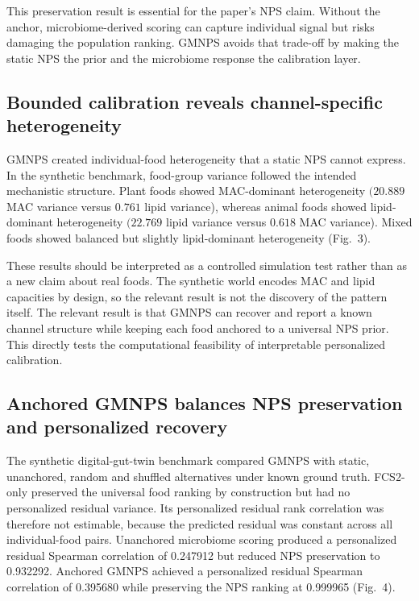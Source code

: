 This preservation result is essential for the paper's NPS claim. Without the
anchor, microbiome-derived scoring can capture individual signal but risks
damaging the population ranking. GMNPS avoids that trade-off by making the
static NPS the prior and the microbiome response the calibration layer.

\subsection*{Bounded calibration reveals channel-specific heterogeneity}

GMNPS created individual-food heterogeneity that a static NPS cannot express.
In the synthetic benchmark, food-group variance followed the intended
mechanistic structure. Plant foods showed MAC-dominant heterogeneity
\((20.889\) MAC variance versus \(0.761\) lipid variance), whereas animal foods
showed lipid-dominant heterogeneity \((22.769\) lipid variance versus \(0.618\)
MAC variance). Mixed foods showed balanced but slightly lipid-dominant
heterogeneity (Fig.~3).

These results should be interpreted as a controlled simulation test rather than
as a new claim about real foods. The synthetic world encodes MAC and lipid
capacities by design, so the relevant result is not the discovery of the
pattern itself. The relevant result is that GMNPS can recover and report a
known channel structure while keeping each food anchored to a universal NPS
prior. This directly tests the computational feasibility of interpretable
personalized calibration.

\subsection*{Anchored GMNPS balances NPS preservation and personalized recovery}

The synthetic digital-gut-twin benchmark compared GMNPS with static,
unanchored, random and shuffled alternatives under known ground truth. FCS2-only
preserved the universal food ranking by construction but had no personalized
residual variance. Its personalized residual rank correlation was therefore not
estimable, because the predicted residual was constant across all
individual-food pairs. Unanchored microbiome scoring produced a personalized
residual Spearman correlation of 0.247912 but reduced NPS preservation to
0.932292. Anchored GMNPS achieved a personalized residual Spearman correlation
of 0.395680 while preserving the NPS ranking at 0.999965 (Fig.~4).


